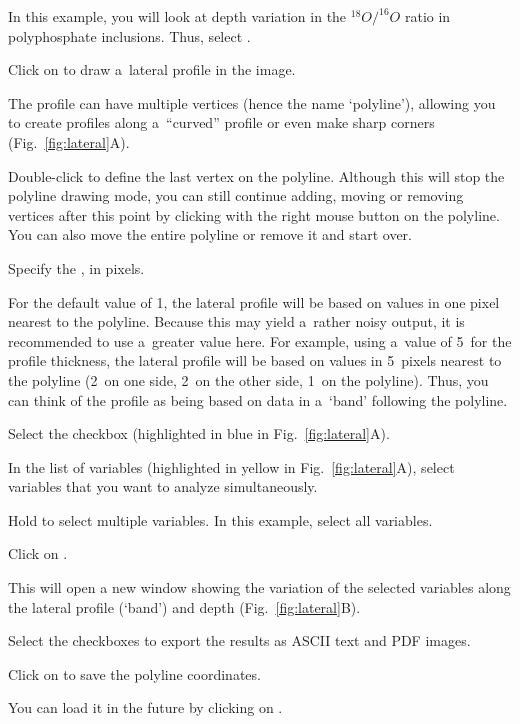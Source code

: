 \bul In this example, you will look at depth variation in the ${}^{18}O/^{16}O$ ratio in polyphosphate inclusions. Thus, select .

\s Click on  to draw a~lateral profile in the image.

\bul The profile can have multiple vertices (hence the name `polyline'), allowing you to create profiles along a~``curved'' profile or even make sharp corners (Fig.~\ref{fig:lateral}A).

\bul Double-click to define the last vertex on the polyline. Although this will stop the polyline drawing mode, you can still continue adding, moving or removing vertices after this point by clicking with the right mouse button on the polyline. You can also move the entire polyline or remove it and start over.

\s Specify the , in pixels.

\bul For the default value of 1, the lateral profile will be based on values in one pixel nearest to the polyline. Because this may yield a~rather noisy output, it is recommended to use a~greater value here. For example, using a~value of 5~for the profile thickness, the lateral profile will be based on values in 5~pixels nearest to the polyline (2~on one side, 2~on the other side, 1~on the polyline). Thus, you can think of the profile as being based on data in a~`band' following the polyline.

\s Select the  checkbox (highlighted in blue in Fig.~\ref{fig:lateral}A).

\s In the list of variables (highlighted in yellow in Fig.~\ref{fig:lateral}A), select variables that you want to analyze simultaneously.

\bul Hold  to select multiple variables. In this example, select all variables.

\s Click on .

\bul This will open a new window showing the variation of the selected variables along the lateral profile (`band') and depth (Fig.~\ref{fig:lateral}B).

\s Select the  checkboxes to export the results as ASCII text and PDF images.

\s Click on  to save the polyline coordinates.

\bul You can load it in the future by clicking on .
